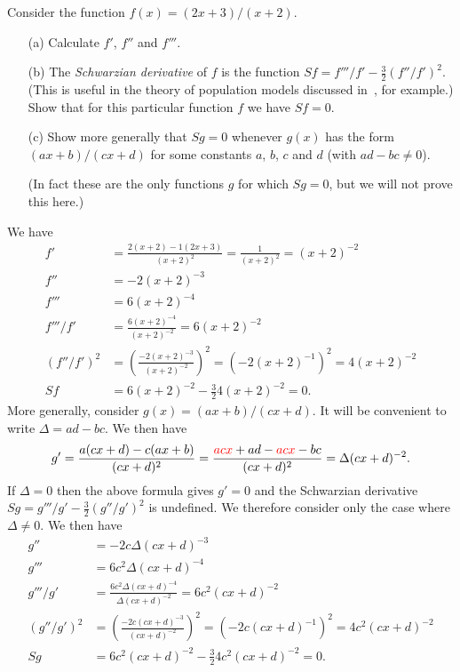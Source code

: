 \documentclass[a4paper]{book}
\newcommand{\RED}[1]{{\color{red}#1}}
\newcommand{\PURPLE}[1]{{\color{purple}#1}}
\newcommand{\Dl}        {\Delta}
\renewcommand{\:}{\colon}
\newcommand{\mathworld}[1]{}
\newcommand{\DEFN}[1]{\PURPLE{\emph{#1}}}
\theoremstyle{definition}
\newenvironment{starex}{
 \renewcommand{\thetheorem}{\arabic{chapter}.\arabic{section}.\arabic{theorem}${}^*$}
 \exercise
}{\endexercise}
\renewenvironment{solution}{\SolutionInline}{\endSolutionInline}
\begin{document}
\begin{starex}
 Consider the function $f(x)=(2x+3)/(x+2)$.  
 \begin{itemize}
  \item[(a)] Calculate $f'$, $f''$ and $f'''$.
  \item[(b)] The \DEFN{Schwarzian derivative}
   \mathworld{SchwarzianDerivative} of $f$ is the function
   $Sf=f'''/f'-\frac{3}{2}(f''/f')^2$.  (This is useful
   in the theory of population models discussed
   in~, for example.)  Show that for
   this particular function $f$ we have $Sf=0$.
  \item[(c)] Show more generally that $Sg=0$ whenever $g(x)$ has the
   form $(ax+b)/(cx+d)$ for some constants $a$, $b$, $c$ and $d$ (with
   $ad-bc\neq 0$).

   (In fact these are the only functions $g$ for which $Sg=0$, but we
   will not prove this here.)
 \end{itemize}
\end{starex}
\begin{solution}
 We have
 \begin{align*}
  f'   &= \frac{2(x+2)-1(2x+3)}{(x+2)^2} =
          \frac{1}{(x+2)^2} = (x+2)^{-2} \\
  f''  &= -2(x+2)^{-3} \\
  f''' &= 6(x+2)^{-4} \\
  f'''/f' &= \frac{6(x+2)^{-4}}{(x+2)^{-2}} = 6 (x+2)^{-2} \\
  (f''/f')^2 &= \left(\frac{-2(x+2)^{-3}}{(x+2)^{-2}}\right)^2 
              = (-2(x+2)^{-1})^2 = 4(x+2)^{-2} \\
  Sf &= 6(x+2)^{-2} - \tfrac{3}{2} 4(x+2)^{-2} = 0. 
 \end{align*}
 More generally, consider $g(x)=(ax+b)/(cx+d)$.  It will be convenient
 to write $\Dl=ad-bc$.  We then have
 \[ g' = \frac{a(cx+d) - c(ax+b)}{(cx+d)^2} 
       = \frac{\RED{acx} + ad - \RED{acx} - bc}{(cx+d)^2} 
       = \Dl (cx+d)^{-2}.
 \]
 If $\Dl=0$ then the above formula gives $g'=0$ and the Schwarzian
 derivative $Sg=g'''/g'-\frac{3}{2}(g''/g')^2$ is
 undefined.  We therefore consider only the case where $\Dl\neq 0$.
 We then have
 \begin{align*}
  g''  &= -2c\Dl(cx+d)^{-3} \\
  g''' &= 6c^2\Dl(cx+d)^{-4} \\
  g'''/g' &= \frac{6c^2\Dl(cx+d)^{-4}}{\Dl(cx+d)^{-2}} =
             6 c^2(cx+d)^{-2} \\
  (g''/g')^2 &= \left(\frac{-2c(cx+d)^{-3}}{(cx+d)^{-2}}\right)^2 
              = (-2c(cx+d)^{-1})^2 = 4c^2(cx+d)^{-2} \\
  Sg &= 6c^2(cx+d)^{-2} - \tfrac{3}{2} 4c^2(cx+d)^{-2} = 0. 
 \end{align*}
\end{solution}
\end{document}
